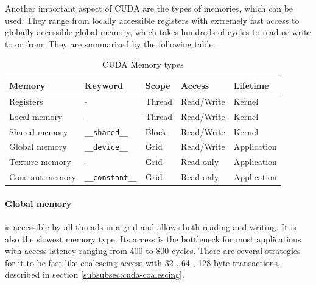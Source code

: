 Another important aspect of CUDA are the types of memories, which can be used. They range from locally accessible registers with extremely fast access to globally accessible global memory, which takes hundreds of cycles to read or write to or from. They are summarized by the following table:

\begin{table}
\centering
\begin{tabularx}{\textwidth}{| X | X | X | X | X |}
\hline
Memory & Keyword & Scope & Access & Lifetime \\
\hline
Registers & - & Thread & Read/Write & Kernel \\
\hline
Local memory & - & Thread & Read/Write & Kernel \\
\hline
Shared memory & \verb|__shared__| & Block & Read/Write &  Kernel \\
\hline
Global memory & \verb|__device__| & Grid & Read/Write & Application \\
\hline
Texture memory & - & Grid & Read-only & Application \\
\hline
Constant memory & \verb|__constant__| & Grid & Read-only & Application \\
\hline
\end{tabularx}
\caption{CUDA Memory types}
\end{table}

\paragraph{Global memory} is accessible by all threads in a grid and allows both reading and writing. It is also the slowest memory type. Its access is the bottleneck for most applications with access latency ranging from 400 to 800 cycles. There are several strategies for it to be fast like coalescing access with 32-, 64-, 128-byte transactions, described in section \ref{subsubsec:cuda-coalescing}.

